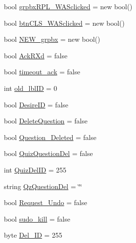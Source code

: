 \begin{DoxyCompactItemize}
\item 
bool \hyperlink{class_sr_p___classroom_inq_1_1frm_classrrom_inq_a97ab9f8512cd6b2f9648651d5c5d404b}{grpbx\-R\-P\-L\-\_\-\-W\-A\-Sclicked} = new bool()
\item 
bool \hyperlink{class_sr_p___classroom_inq_1_1frm_classrrom_inq_aed9d1ad7c4e2b196997c1820ac2cdb4d}{btn\-C\-L\-S\-\_\-\-W\-A\-Sclicked} = new bool()
\item 
bool \hyperlink{class_sr_p___classroom_inq_1_1frm_classrrom_inq_aaf5a152b29ae06c11e8e25f0eabf454d}{\-N\-E\-W\-\_\-grpbx} = new bool()
\item 
bool \hyperlink{class_sr_p___classroom_inq_1_1frm_classrrom_inq_a65b6633a5bc7bff8142fcace6bfba3f8}{\-Ack\-R\-Xd} = false
\item 
bool \hyperlink{class_sr_p___classroom_inq_1_1frm_classrrom_inq_a64cde7d8ac96b5122de783724c58103a}{timeout\-\_\-ack} = false
\item 
int \hyperlink{class_sr_p___classroom_inq_1_1frm_classrrom_inq_ac56e0f039ce0113331d9bdd322b30827}{old\-\_\-lbl\-I\-D} = 0
\item 
bool \hyperlink{class_sr_p___classroom_inq_1_1frm_classrrom_inq_aad36cc9a93fb79969dd3b0d0fe52b793}{\-Desire\-I\-D} = false
\item 
bool \hyperlink{class_sr_p___classroom_inq_1_1frm_classrrom_inq_ab3a8803fac827da5757e7451c1836010}{\-Delete\-Question} = false
\item 
bool \hyperlink{class_sr_p___classroom_inq_1_1frm_classrrom_inq_a8f54ae3a0ea7bb9dafed984a53155fd8}{\-Question\-\_\-\-Deleted} = false
\item 
bool \hyperlink{class_sr_p___classroom_inq_1_1frm_classrrom_inq_aa1c6ba1dda756081aba5b3cfea87b09d}{\-Quiz\-Question\-Del} = false
\item 
int \hyperlink{class_sr_p___classroom_inq_1_1frm_classrrom_inq_a2221a860fdb3bc2837b3ca3c0cee182c}{\-Quiz\-Del\-I\-D} = 255
\item 
string \hyperlink{class_sr_p___classroom_inq_1_1frm_classrrom_inq_a1fe88369748706492ccc7292a0e47331}{\-Qz\-Question\-Del} = \char`\"{}\char`\"{}
\item 
bool \hyperlink{class_sr_p___classroom_inq_1_1frm_classrrom_inq_acb5bab8dcbcbfc8ed7a5b260ddba84e3}{\-Request\-\_\-\-Undo} = false
\item 
bool \hyperlink{class_sr_p___classroom_inq_1_1frm_classrrom_inq_a3ac2217a30904b65be786ee00a312fea}{sudo\-\_\-kill} = false
\item 
byte \hyperlink{class_sr_p___classroom_inq_1_1frm_classrrom_inq_a9874b3534409b79a483f08f2aa03668d}{\-Del\-\_\-\-I\-D} = 255

\end{DoxyCompactItemize}
